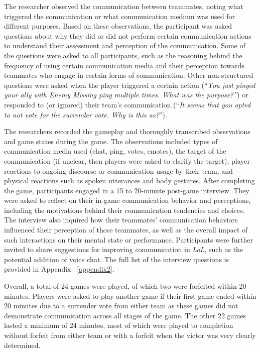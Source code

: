 The researcher observed the communication between teammates, noting what triggered the communication or what communication medium was used for different purposes. Based on these observations, the participant was asked questions about why they did or did not perform certain communication actions to understand their assessment and perception of the communication. Some of the questions were asked to all participants, such as the reasoning behind the frequency of using certain communication media and their perception towards teammates who engage in certain forms of communication. Other non-structured questions were asked when the player triggered a certain action (``\textit{You just pinged your ally with Enemy Missing ping multiple times. What was the purpose?''}) or responded to (or ignored) their team's communication (``\textit{It seems that you opted to not vote for the surrender vote. Why is this so?}'').

The researchers recorded the gameplay and thoroughly transcribed observations and game states during the game. The observations included types of communication media used (chat, ping, votes, emotes), the target of the communication (if unclear, then players were asked to clarify the target), player reactions to ongoing discourse or communication usage by their team, and physical reactions such as spoken utterances and body gestures. After completing the game, participants engaged in a 15 to 20-minute post-game interview. They were asked to reflect on their in-game communication behavior and perceptions, including the motivations behind their communication tendencies and choices. The interview also inquired how their teammates' communication behaviors influenced their perception of those teammates, as well as the overall impact of such interactions on their mental state or performance. Participants were further invited to share suggestions for improving communication in \textit{LoL}, such as the potential addition of voice chat. The full list of the interview questions is provided in Appendix ~\ref{appendix2}.

Overall, a total of 24 games were played, of which two were forfeited within 20 minutes. Players were asked to play another game if their first game ended within 20 minutes due to a surrender vote from either team as these games did not demonstrate communication across all stages of the game. The other 22 games lasted a minimum of 24 minutes, most of which were played to completion without forfeit from either team or with a forfeit when the victor was very clearly determined.


